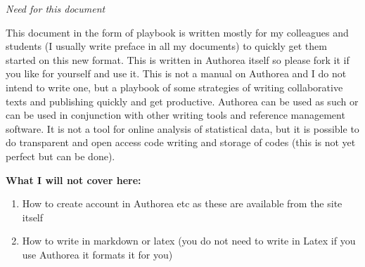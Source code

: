 \textit{Need for this document} 

This document in the form of playbook is written mostly for my colleagues and students (I usually write preface in all my documents) to quickly get them started on this new format. This is written in Authorea itself so please fork it if you like for yourself and use it. This is not a manual on Authorea and I do not intend to write one, but a playbook of some strategies of writing collaborative texts and publishing quickly and get productive. Authorea can be used as such or can be used in conjunction with other writing tools and reference management software. It is not a tool for online analysis of statistical data, but it is possible to do transparent and open access code writing and storage of codes (this is not yet perfect but can be done). 

\textbf{What I will not cover here:}

\begin{enumerate}
\item How to create account in Authorea etc as these are available from the site itself
\item How to write in markdown or latex (you do not need to write in Latex if you use Authorea it formats it for you)
\end{enumerate}




    
    
    